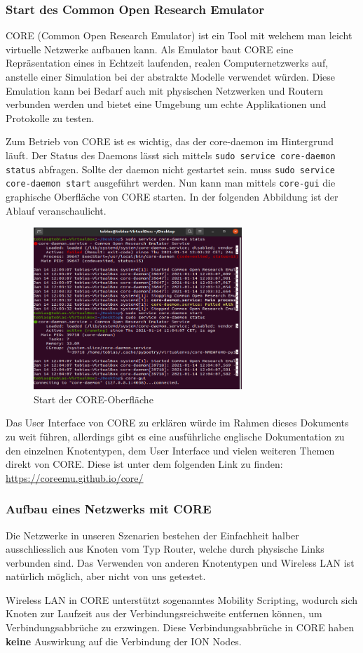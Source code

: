 \documentclass{article}
\begin{document}
\subsubsection{Start des Common Open Research Emulator}
CORE (Common Open Research Emulator) ist ein Tool mit welchem man leicht virtuelle Netzwerke aufbauen kann. Als Emulator baut CORE eine Repräsentation eines in Echtzeit laufenden, realen Computernetzwerks auf, anstelle einer Simulation bei der abstrakte Modelle verwendet würden. Diese Emulation kann bei Bedarf auch mit physischen Netzwerken und Routern verbunden werden und bietet eine Umgebung um echte Applikationen und Protokolle zu testen. \cite{core-docs}\par
Zum Betrieb von CORE ist es wichtig, das der core-daemon im Hintergrund läuft. Der Status des Daemons lässt sich mittels \texttt{sudo service core-daemon status} abfragen. Sollte der daemon nicht gestartet sein. muss \texttt{sudo service core-daemon start} ausgeführt werden. Nun kann man mittels \texttt{core-gui} die graphische Oberfläche von CORE starten. In der folgenden Abbildung ist der Ablauf veranschaulicht.\par
\begin{figure}[ht]
\centering
\includegraphics[width=0.7\textwidth]{core-start}
\caption{Start der CORE-Oberfläche}
\end{figure}
Das User Interface von CORE zu erklären würde im Rahmen dieses Dokuments zu weit führen, allerdings gibt es eine ausführliche englische Dokumentation zu den einzelnen Knotentypen, dem User Interface und vielen weiteren Themen direkt von CORE. Diese ist unter dem folgenden Link zu finden: \url{https://coreemu.github.io/core/}\par
\subsubsection{Aufbau eines Netzwerks mit CORE}
Die Netzwerke in unseren Szenarien bestehen der Einfachheit halber ausschliesslich aus Knoten vom Typ Router, welche durch physische Links verbunden sind. Das Verwenden von anderen Knotentypen und Wireless LAN ist natürlich möglich, aber nicht von uns getestet.\par
Wireless LAN in CORE unterstützt sogenanntes Mobility Scripting, wodurch sich Knoten zur Laufzeit aus der Verbindungsreichweite entfernen können, um Verbindungsabbrüche zu erzwingen. Diese Verbindungsabbrüche in CORE haben \textbf{keine} Auswirkung auf die Verbindung der ION Nodes.
\end{document}
